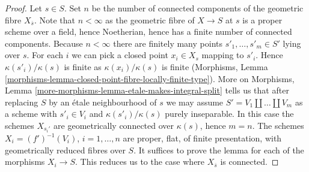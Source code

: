 \begin{proof}
Let $s \in S$. Set $n$ be the number of connected components of
the geometric fibre $X_{\overline{s}}$. Note that $n < \infty$ as the geometric
fibre of $X \to S$ at $s$ is a proper scheme over a field, hence Noetherian,
hence has a finite number of connected components.
Because $n < \infty$ there are finitely many points
$s'_1, \ldots, s'_m \in S'$ lying over $s$.
For each $i$ we can pick a closed point $x_i \in X_s$
mapping to $s'_i$. Hence $\kappa(s'_i)/\kappa(s)$ is finite
as $\kappa(x_i)/\kappa(s)$ is finite (Morphisms,
Lemma \ref{morphisms-lemma-closed-point-fibre-locally-finite-type}).
More on Morphisms,
Lemma \ref{more-morphisms-lemma-etale-makes-integral-split}
tells us that after replacing $S$ by an \'etale neighbourhood
of $s$ we may assume $S' = V_1 \amalg \ldots \amalg V_m$ as a scheme
with $s'_i \in V_i$ and $\kappa(s'_i)/\kappa(s)$ purely inseparable.
In this case the schemes $X_{s_i'}$ are geometrically connected
over $\kappa(s)$, hence $m = n$.
The schemes $X_i = (f')^{-1}(V_i)$, $i = 1, \ldots, n$
are proper, flat, of finite presentation, with geometrically
reduced fibres over $S$. It suffices to prove the lemma
for each of the morphisms $X_i \to S$. This reduces us to the case where
$X_{\overline{s}}$ is connected.


\end{proof}

